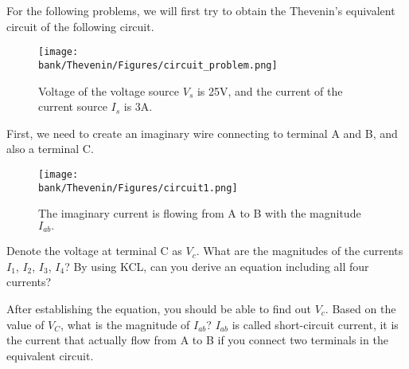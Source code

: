 For the following problems, we will first try to obtain the Thevenin's equivalent circuit of the following circuit.
\begin{figure}[H]
  \centering
  \texttt{[image: \\bank/Thevenin/Figures/circuit\_problem.png]}
  \caption{Voltage of the voltage source $V_s$ is 25V, and the current of the current source $I_s$ is 3A.}
  \label{A Circuit problem}
\end{figure}

\begin{enumerate}
  \qitem 
   First, we need to create an imaginary wire connecting to terminal A and B, and also a terminal C.
   \begin{figure}[H]
    \centering
    \texttt{[image: \\bank/Thevenin/Figures/circuit1.png]}
    \caption{The imaginary current is flowing from A to B with the magnitude $I_{ab}.$}
    \label{A Circuit problem}
  \end{figure}
  Denote the voltage at terminal C as $V_c$. What are the magnitudes of the currents $I_1$, $I_2$, $I_3$, $I_4$?
  By using KCL, can you derive an equation including all four currents?



  \qitem After establishing the equation, you should be able to find out $V_c$. Based on the value of $V_C$, what is the
  magnitude of $I_{ab}$? $I_{ab}$ is called short-circuit current, it is the current that actually flow from A to B if you connect
  two terminals in the equivalent circuit.


\end{enumerate}
